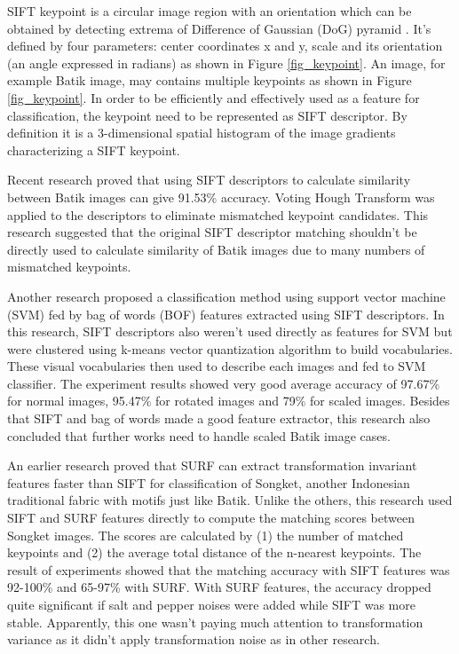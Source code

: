 \documentclass[conference, compsoc]{IEEEtran}
\begin{document}
SIFT keypoint is a circular image region with an orientation which can be obtained by detecting extrema of Difference of Gaussian (DoG) pyramid \cite{lowe2004distinctive}. It's defined by four parameters: center coordinates x and y, scale and its orientation (an angle expressed in radians) as shown in Figure \ref{fig_keypoint}. An image, for example Batik image, may contains multiple keypoints as shown in Figure \ref{fig_keypoint}. In order to be efficiently and effectively used as a feature for classification, the keypoint need to be represented as SIFT descriptor. By definition it is a 3-dimensional spatial histogram of the image gradients characterizing a SIFT keypoint.

Recent research \cite{nurhaida2015automatic} proved that using SIFT descriptors to calculate similarity between Batik images can give 91.53\% accuracy. Voting Hough Transform was applied to the descriptors to eliminate mismatched keypoint candidates. This research suggested that the original SIFT descriptor matching shouldn't be directly used to calculate similarity of Batik images due to many numbers of mismatched keypoints.

Another research \cite{azhar2015batik} proposed a classification method using support vector machine (SVM) fed by bag of words (BOF) features extracted using SIFT descriptors. In this research, SIFT descriptors also weren't used directly as features for SVM but were clustered using k-means vector quantization algorithm to build vocabularies. These visual vocabularies then used to describe each images and fed to SVM classifier. The experiment results showed very good average accuracy of 97.67\% for normal images, 95.47\% for rotated images and 79\% for scaled images. Besides that SIFT and bag of words made a good feature extractor, this research also concluded that further works need to handle scaled Batik image cases.

An earlier research \cite{willy2013evaluation} proved that SURF can extract transformation invariant features faster than SIFT for classification of Songket, another Indonesian traditional fabric with motifs just like Batik. Unlike the others, this research used SIFT and SURF features directly to compute the matching scores between Songket images. The scores are calculated by (1) the number of matched keypoints and (2) the average total distance of the n-nearest keypoints. The result of experiments showed that the matching accuracy with SIFT features was 92-100\% and 65-97\% with SURF. With SURF features, the accuracy dropped quite significant if salt and pepper noises were added while SIFT was more stable. Apparently, this one wasn't paying much attention to transformation variance as it didn't apply transformation noise as in other research\cite{azhar2015batik}.
\end{document}
